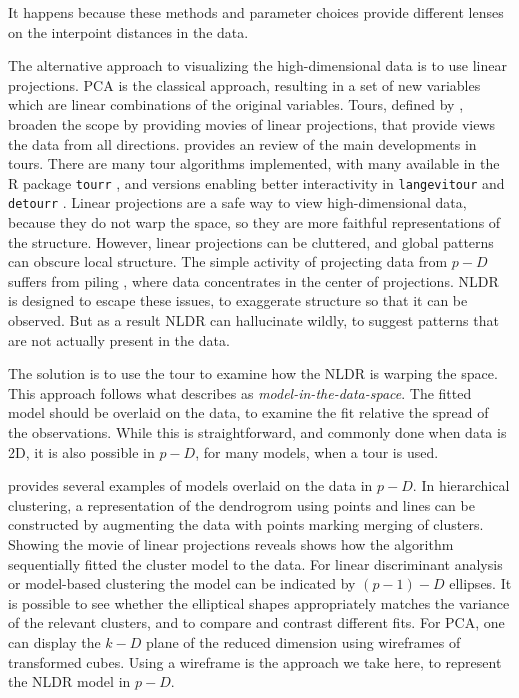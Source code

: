 \documentclass[
  12pt]{article}
\begin{document}
It happens because these methods and parameter choices provide different
lenses on the interpoint distances in the data.

The alternative approach to visualizing the high-dimensional data is to
use linear projections. PCA is the classical approach, resulting in a
set of new variables which are linear combinations of the original
variables. Tours, defined by \citet{Asimov1985}, broaden the scope by
providing movies of linear projections, that provide views the data from
all directions. \citet{lee2021review} provides an review of the main
developments in tours. There are many tour algorithms implemented, with
many available in the R package \texttt{tourr} \citep{article61}, and
versions enabling better interactivity in \texttt{langevitour}
\citep{article09} and \texttt{detourr} \citep{article22}. Linear
projections are a safe way to view high-dimensional data, because they
do not warp the space, so they are more faithful representations of the
structure. However, linear projections can be cluttered, and global
patterns can obscure local structure. The simple activity of projecting
data from \(p-D\) suffers from piling \citep{laa2022}, where data
concentrates in the center of projections. NLDR is designed to escape
these issues, to exaggerate structure so that it can be observed. But as
a result NLDR can hallucinate wildly, to suggest patterns that are not
actually present in the data.

The solution is to use the tour to examine how the NLDR is warping the
space. This approach follows what \citet{article08} describes as
\emph{model-in-the-data-space}. The fitted model should be overlaid on
the data, to examine the fit relative the spread of the observations.
While this is straightforward, and commonly done when data is 2D, it is
also possible in \(p-D\), for many models, when a tour is used.

\citet{article08} provides several examples of models overlaid on the
data in \(p-D\). In hierarchical clustering, a representation of the
dendrogrom using points and lines can be constructed by augmenting the
data with points marking merging of clusters. Showing the movie of
linear projections reveals shows how the algorithm sequentially fitted
the cluster model to the data. For linear discriminant analysis or
model-based clustering the model can be indicated by \((p-1)-D\)
ellipses. It is possible to see whether the elliptical shapes
appropriately matches the variance of the relevant clusters, and to
compare and contrast different fits. For PCA, one can display the
\(k-D\) plane of the reduced dimension using wireframes of transformed
cubes. Using a wireframe is the approach we take here, to represent the
NLDR model in \(p-D\).
\end{document}
